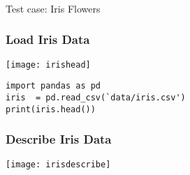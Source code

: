 \begin{frame}[fragile]\frametitle{}
\begin{center}
{\Large Test case: Iris Flowers}
\end{center}
\end{frame}


\begin{frame}[fragile]\frametitle{Load Iris Data}

\begin{center}
\texttt{[image: irishead]}
\end{center}


\begin{lstlisting}
import pandas as pd
iris  = pd.read_csv(`data/iris.csv')
print(iris.head())
\end{lstlisting}

\end{frame}






\begin{frame}[fragile]\frametitle{Describe Iris Data}
\begin{center}
\texttt{[image: irisdescribe]}
\end{center}
\end{frame}

